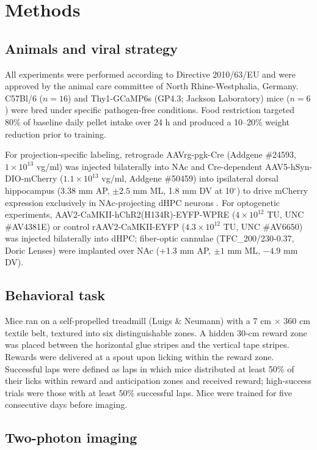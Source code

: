 \documentclass[11pt]{article}
\begin{document}
\section{Methods}

\subsection{Animals and viral strategy}

All experiments were performed according to Directive 2010/63/EU and were approved by the animal care committee of North Rhine-Westphalia, Germany. C57Bl/6 ($n=16$) and Thy1-GCaMP6s (GP4.3; Jackson Laboratory) mice ($n=6$) were bred under specific pathogen-free conditions. Food restriction targeted 80\% of baseline daily pellet intake over 24 h and produced a 10--20\% weight reduction prior to training.

For projection-specific labeling, retrograde AAVrg-pgk-Cre (Addgene \#24593, $1\times10^{13}$ vg/ml) was injected bilaterally into NAc and Cre-dependent AAV5-hSyn-DIO-mCherry ($1.1\times10^{13}$ vg/ml, Addgene \#50459) into ipsilateral dorsal hippocampus (3.38 mm AP, $\pm 2.5$ mm ML, 1.8 mm DV at 10$^\circ$) to drive mCherry expression exclusively in NAc-projecting dHPC neurons \citep{Tervo2016AAVretro}. For optogenetic experiments, AAV2-CaMKII-hChR2(H134R)-EYFP-WPRE ($4\times10^{12}$ TU, UNC \#AV4381E) or control rAAV2-CaMKII-EYFP ($4.3\times10^{12}$ TU, UNC \#AV6650) was injected bilaterally into dHPC; fiber-optic cannulae (TFC\_200/230-0.37, Doric Lenses) were implanted over NAc (+1.3 mm AP, $\pm 1$ mm ML, $-4.9$ mm DV).

\subsection{Behavioral task}

Mice ran on a self-propelled treadmill (Luigs \& Neumann) with a 7 cm $\times$ 360 cm textile belt, textured into six distinguishable zones. A hidden 30-cm reward zone was placed between the horizontal glue stripes and the vertical tape stripes. Rewards were delivered at a spout upon licking within the reward zone. Successful laps were defined as laps in which mice distributed at least 50\% of their licks within reward and anticipation zones and received reward; high-success trials were those with at least 50\% successful laps. Mice were trained for five consecutive days before imaging.

\subsection{Two-photon imaging}
\end{document}
